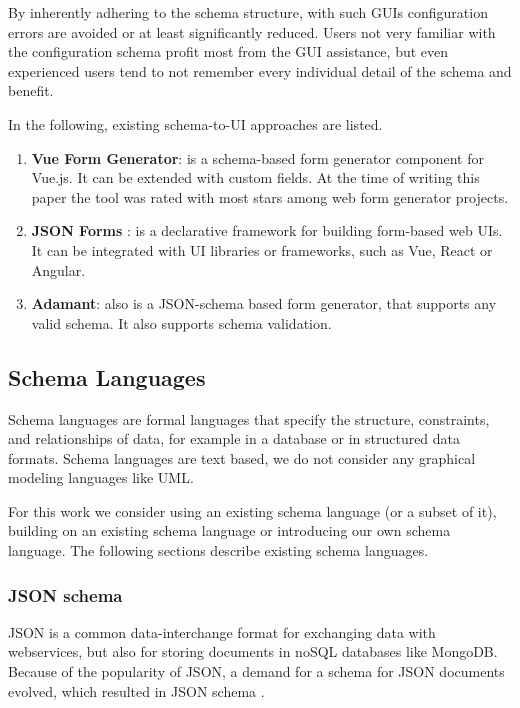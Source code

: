 \documentclass[lettersize,journal]{IEEEtran}
\begin{document}
By inherently adhering to the schema structure, with such GUIs configuration errors are avoided or at least significantly reduced. Users not very familiar with the configuration schema profit most from the GUI assistance, but even experienced users tend to not remember every individual detail of the schema and benefit.

In the following, existing schema-to-UI approaches are listed.


\begin{enumerate}[label=(\alph*)]
    \item \textbf{Vue Form Generator}\cite{vueformgenerator}: is a schema-based form generator component for Vue.js. It can be extended with custom fields. At the time of writing this paper the tool was rated with most stars among web form generator projects.
    
    \item \textbf{JSON Forms} \cite{JSONForms}: is a declarative framework for building form-based web UIs. It can be integrated with UI libraries or frameworks, such as Vue, React or Angular.
    
    \item \textbf{Adamant}\cite{siffa2022adamant}: also is a JSON-schema based form generator, that supports any valid schema. It also supports schema validation.
    
\end{enumerate}

\subsection{Schema Languages}\label{sub:schemalanguages}

Schema languages are formal languages that specify the structure, constraints, and relationships of data, for example in a database or in structured data formats. Schema languages are text based, we do not consider any graphical modeling languages like UML.

For this work we consider using an existing schema language (or a subset of it), building on an existing schema language or introducing our own schema language.
The following sections describe existing schema languages.

\subsubsection{JSON schema}

JSON is a common data-interchange format for exchanging data with webservices, but also for storing documents in noSQL databases like MongoDB.
Because of the popularity of JSON, a demand for a schema for JSON documents evolved, which resulted in JSON schema \cite{jsonSchema, jsonschemaJSONSchema}. 
\end{document}
